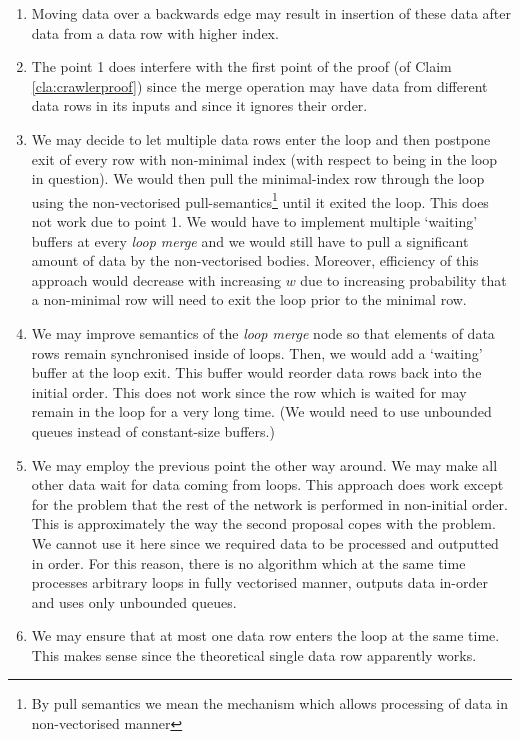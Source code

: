 \begin{enumerate}
    \item Moving data over a backwards edge may result in insertion of these data after data from a data row with higher index. 
    \item The point 1 does interfere with the first point of the proof (of Claim \ref{cla:crawlerproof}) since the merge operation may have data from different data rows in its inputs and since it ignores their order.
    \item We may decide to let multiple data rows enter the loop and then postpone exit of every row with non-minimal index (with respect to being in the loop in question). We would then pull the minimal-index row through the loop using the non-vectorised pull-semantics\footnote{By pull semantics we mean the mechanism which allows processing of data in non-vectorised manner} until it exited the loop. This does not work due to point 1. We would have to implement multiple `waiting' buffers at every \emph{loop merge} and we would still have to pull a significant amount of data by the non-vectorised bodies. Moreover, efficiency of this approach would decrease with increasing $w$ due to increasing probability that a non-minimal row will need to exit the loop prior to the minimal row.
    \item We may improve semantics of the \emph{loop merge} node so that elements of data rows remain synchronised inside of loops. Then, we would add a `waiting' buffer at the loop exit. This buffer would reorder data rows back into the initial order. This does not work since the row which is waited for may remain in the loop for a very long time. (We would need to use unbounded queues instead of constant-size buffers.)
    \item We may employ the previous point the other way around. We may make all other data wait for data coming from loops. This approach does work except for the problem that the rest of the network is performed in non-initial order. This is approximately the way the second proposal copes with the problem. We cannot use it here since we required data to be processed and outputted in order. For this reason, there is no algorithm which at the same time processes arbitrary loops in fully vectorised manner, outputs data in-order and uses only unbounded queues.
    \item We may ensure that at most one data row enters the loop at the same time. This makes sense since the theoretical single data row apparently works. 
\end{enumerate}

